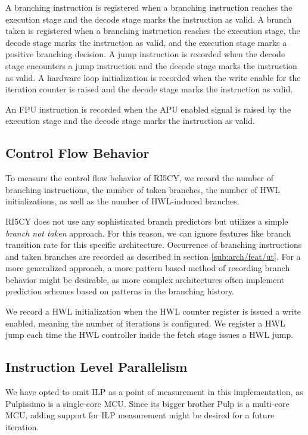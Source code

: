 \documentclass[../bachelor_paper.tex]{subfiles}
\begin{document}
A branching instruction is registered when a branching instruction reaches the execution stage and the decode stage marks the instruction as valid. A branch taken is registered when a branching instruction reaches the execution stage, the decode stage marks the instruction as valid, and the execution stage marks a positive branching decision. A jump instruction is recorded when the decode stage encounters a jump instruction and the decode stage marks the instruction as valid. A hardware loop initialization is recorded when the write enable for the iteration counter is raised and the decode stage marks the instruction as valid. 

An \ac{FPU} instruction is recorded when the \ac{APU} enabled signal is raised by the execution stage and the decode stage marks the instruction as valid.

\subsection{Control Flow Behavior}
    \label{sub:arch/feat/ctrl}
To measure the control flow behavior of RI5CY, we record the number of branching instructions, the number of taken branches, the number of \ac{HWL} initializations, as well as the number of \ac{HWL}-induced branches.

RI5CY does not use any sophisticated branch predictors but utilizes a simple \emph{branch not taken} approach. For this reason, we can ignore features like branch transition rate \cite{haungsBranchTransitionRate2000} for this specific architecture. Occurrence of branching instructions and taken branches are recorded as described in section \ref{sub:arch/feat/ut}. For a more generalized approach, a more pattern based method of recording branch behavior might be desirable, as more complex architectures often implement prediction schemes based on patterns in the branching history.

We record a \ac{HWL} initialization when the \ac{HWL} counter register is issued a write enabled, meaning the number of iterations is configured. We register a \ac{HWL} jump each time the \ac{HWL} controller inside the fetch stage issues a \ac{HWL} jump.

\subsection{Instruction Level Parallelism}
We have opted to omit \ac{ILP} as a point of measurement in this implementation, as Pulpissimo is a single-core \ac{MCU}. Since its bigger brother Pulp \cite{pulliniMrWolfEnergyPrecision2019} is a multi-core \ac{MCU}, adding support for \ac{ILP} measurement might be desired for a future iteration.
\end{document}
